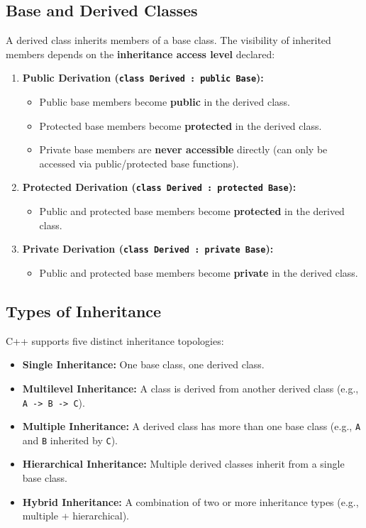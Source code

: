 \documentclass[12pt,a4paper]{article}
\begin{document}
\subsection{Base and Derived Classes}
A derived class inherits members of a base class. The visibility of inherited members depends on the \textbf{inheritance access level} declared:
\begin{enumerate}[label=\textbf{\arabic*.}, leftmargin=*, itemsep=2.5pt]
  \item \textbf{Public Derivation (\texttt{class Derived : public Base}):} 
    \begin{itemize}[leftmargin=1.5em, itemsep=1pt, topsep=1pt]
      \item Public base members become \textbf{public} in the derived class.
      \item Protected base members become \textbf{protected} in the derived class.
      \item Private base members are \textbf{never accessible} directly (can only be accessed via public/protected base functions).
    \end{itemize}
  \item \textbf{Protected Derivation (\texttt{class Derived : protected Base}):} 
    \begin{itemize}[leftmargin=1.5em, itemsep=1pt, topsep=1pt]
      \item Public and protected base members become \textbf{protected} in the derived class.
    \end{itemize}
  \item \textbf{Private Derivation (\texttt{class Derived : private Base}):} 
    \begin{itemize}[leftmargin=1.5em, itemsep=1pt, topsep=1pt]
      \item Public and protected base members become \textbf{private} in the derived class.
    \end{itemize}
\end{enumerate}

\subsection{Types of Inheritance}
C++ supports five distinct inheritance topologies:
\begin{itemize}[leftmargin=*, itemsep=3pt]
  \item \textbf{Single Inheritance:} One base class, one derived class.
  \item \textbf{Multilevel Inheritance:} A class is derived from another derived class (e.g., \texttt{A -> B -> C}).
  \item \textbf{Multiple Inheritance:} A derived class has more than one base class (e.g., \texttt{A} and \texttt{B} inherited by \texttt{C}).
  \item \textbf{Hierarchical Inheritance:} Multiple derived classes inherit from a single base class.
  \item \textbf{Hybrid Inheritance:} A combination of two or more inheritance types (e.g., multiple + hierarchical).
\end{itemize}
\end{document}
